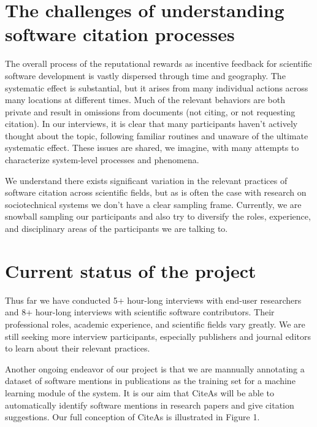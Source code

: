 \documentclass[sigchi-a,screen]{acmart}
\begin{document}
\section{The challenges of understanding software citation processes}

The overall process of the reputational rewards as incentive feedback for scientific software development is vastly dispersed through time and geography. The systematic effect is substantial, but it arises from many individual actions across many locations at different times. Much of the relevant behaviors are both private and result in omissions from documents (not citing, or not requesting citation). In our interviews, it is clear that many participants haven't actively thought about the topic, following familiar routines and unaware of the ultimate systematic effect. These issues are shared, we imagine, with many attempts to characterize system-level processes and phenomena. 

We understand there exists significant variation in the relevant practices of software citation across scientific fields, but as is often the case with research on sociotechnical systems we don't have a clear sampling frame. Currently, we are snowball sampling our participants and also try to diversify the roles, experience, and disciplinary areas of the participants we are talking to.

\section{Current status of the project}

Thus far we have conducted 5+ hour-long interviews with end-user researchers and 8+ hour-long interviews with scientific software contributors. Their professional roles, academic experience, and scientific fields vary greatly. We are still seeking more interview participants, especially publishers and journal editors to learn about their relevant practices.

Another ongoing endeavor of our project is that we are mannually annotating a dataset of software mentions in publications as the training set for a machine learning module of the system. It is our aim that CiteAs will be able to automatically identify software mentions in research papers and give citation suggestions. Our full conception of CiteAs is illustrated in Figure 1.
\end{document}
